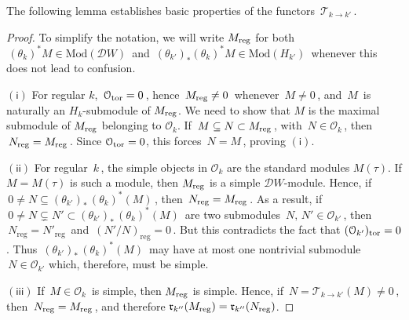 \documentclass{amsart}
\newtheorem{lemma}[theorem]{Lemma}
\theoremstyle{definition}
\theoremstyle{remark}
\numberwithin{equation}{section}
\begin{document}
The following lemma establishes basic properties of the functors $\,{\mathcal{T}}_{k \to k'}\,$.
\begin{proof}
To simplify the notation, we will write $ {M_{\rm{reg}}} $ for both
$\, (\theta_k)^* M \in {\mathrm{Mod}}({\mathcal{D}} W) \,$ and
$\, (\theta_{k'})_* (\theta_k)^* M \in {\mathrm{Mod}}(H_{k'})\,$
whenever this does not lead to confusion.

$\mathsf{(i)}$ For regular $k$, $\,{{\mathcal{O}}_{\rm{tor}}}=0\,$, hence
$\,{M_{\rm{reg}}} \ne 0\,$ whenever $\, M \ne 0 \,$, and $\,M \,$ is
naturally an $H_k$-submodule of $ {M_{\rm{reg}}}$. We need to show
that $M$ is the maximal submodule of $ {M_{\rm{reg}}}$ belonging
to $ {\mathcal{O}}_k $. If $\, M \subseteq N \subset {M_{\rm{reg}}}\,$,
with $\,N\in {\mathcal{O}}_k\,$, then $\,N_{\mathrm{reg}}= {M_{\rm{reg}}}\,$.
Since ${{\mathcal{O}}_{\rm{tor}}}=0$, this forces $\,N=M\,$, proving $\mathsf{(i)}$.

$\mathsf{(ii)}$ For regular $\,k\,$, the simple objects in $ {\mathcal{O}}_k $ are the standard modules
$M(\tau)$. If $ M = M(\tau) $ is such a module, then ${M_{\rm{reg}}}$
is a simple ${\mathcal{D}} W$-module. Hence, if $\, 0\ne N\subseteq (\theta_{k'})_* \,(\theta_k)^*(M) \,$,
then $\,N_{\mathrm{reg}}={M_{\rm{reg}}}\,$. As a result,
if $\,0\ne N \subsetneq N'\subset (\theta_{k'})_* \,(\theta_k)^*(M)\,$ are two
submodules $\, N,\, N' \in {\mathcal{O}}_{k'} \,$, then $\,N_{\mathrm{reg}}=N'_{\mathrm{reg}}\,$
and $\,(N'/N)_{\mathrm{reg}}=0\,$.
But this contradicts the fact that $({\mathcal{O}}_{k'})_{\rm tor}=0 $.
Thus $\,(\theta_{k'})_* \,(\theta_k)^*(M)\,$ may have at most
one nontrivial submodule $\, N\in {\mathcal{O}}_{k'}$ which,
therefore, must be simple.

$\mathsf{(iii)}$ If $\,M\in {\mathcal{O}}_k\,$ is simple, then ${M_{\rm{reg}}}$ is simple.
Hence, if $\,N= {\mathcal{T}}_{k \to k'}(M) \ne 0\,$, then $\,N_{\mathrm{reg}}={M_{\rm{reg}}}\,$,
and therefore $ {\mathfrak{r}}_{k''}({M_{\rm{reg}}}) = {\mathfrak{r}}_{k''}(N_{\mathrm{reg}})$.
\end{proof}
\end{document}

